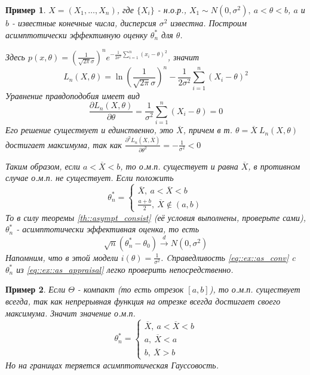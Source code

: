\documentclass[12pt]{article}
\newtheorem*{example}{Пример}
\theoremstyle{basic_theorem}
\theoremstyle{name_theorem}
\begin{document}
\begin{example}
        \(X = (X_1, \ldots, X_n)\), где \(\{X_i\}\) - н.о.р., \(X_1 \sim N(0, \sigma^2),\ a < \theta < b\),
        \(a\) и \(b\) - известные конечные числа, дисперсия \(\sigma^2\) известна.
        Построим асимптотически эффективную оценку \(\theta^*_n\) для \(\theta\).

        Здесь \(p(x, \theta) = \left(\frac{1}{\sqrt{2\pi} \sigma}\right)^ne^{-\frac{1}{2\sigma^2}\sum_{i=1}^n (x_i-\theta)^2}\),
        значит
        \[L_n(X, \theta) = \ln\left(\frac{1}{\sqrt{2\pi}\sigma}\right)^n - \frac{1}{2\sigma^2}\sum_{i=1}^n(X_i-\theta)^2\]
        Уравнение правдоподобия имеет вид
        \[\frac{\partial L_n(X, \theta)}{\partial\theta} = \frac{1}{\sigma^2}\sum_{i=1}^n(X_i - \theta) = 0\]
        Его решение существует и единственно, это \(\overline{X}\), причем
        в т. \(\theta = \overline{X}\ L_n(X,\theta)\) достигает максимума,
        так как \(\frac{\partial^2 L_n(X, \overline{X})}{\partial\theta^2} = - \frac{1}{\sigma^2} < 0\)

        Таким образом, если \(a < \overline{X} < b\), то о.м.п. существует и равна \(\overline{X}\),
        в противном случае о.м.п. не существует. Если положить
        \begin{equation}
            \label{eq::ex::as_appraisal}
            \theta^*_n = \begin{cases}
                \overline{X},\ a < \overline{X} < b \\
                \frac{a+b}{2},\ \overline{X} \notin (a,b)
            \end{cases}
        \end{equation}
        То в силу теоремы \ref{th::asympt_consist} (её условия
        выполнены, проверьте сами), \(\theta^*_n\) - асимптотически эффективная оценка, то есть
        \begin{equation}
            \label{eq::ex::as_conv}
            \sqrt{n}(\theta^*_n - \theta_0) \xrightarrow{d} N(0, \sigma^2)
        \end{equation}
        Напомним, что в этой модели \(i(\theta) = \frac{1}{\sigma^2}\).
        Cправедливость \eqref{eq::ex::as_conv} c \(\theta^*_n\)
        из \eqref{eq::ex::as_appraisal} легко проверить непосредственно.
\end{example}
\begin{example}
    Если \(\Theta\) - компакт (то есть отрезок \([a, b]\)), то о.м.п. существует
    всегда, так как непрерывная функция на отрезке всегда достигает своего максимума.
    Значит значение о.м.п.
    \begin{equation*}
        \theta^*_n = \begin{cases}
            \overline{X},\ a < \overline{X} < b \\
            a,\ \overline{X} < a \\
            b,\ \overline{X} > b
        \end{cases}
    \end{equation*}
    Но на границах теряется асимптотическая Гауссовость.
\end{example}
\end{document}
